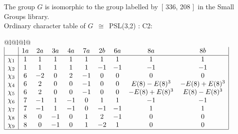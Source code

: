 \documentclass[varwidth=\maxdimen,border=10]{standalone}
\begin{document}
The group $G$ is isomorphic to the group labelled by\ [ 336, 208 ]\ in the Small Groups library.\\
Ordinary character table of $G$\ $\cong$\ PSL(3,2) : C2:\\
\begin{center}
\begin{tabular}{@{}l@{}l@{}l@{}}
\hline
\(\begin{array}{|l|ccccccccc|}
  & 1a & 2a & 3a & 4a & 7a & 2b & 6a & 8a & 8b\\ \hline
\chi_{1} & 1 & 1 & 1 & 1 & 1 & 1 & 1 & 1 & 1\\
\chi_{2} & 1 & 1 & 1 & 1 & 1 & -1 & -1 & -1 & -1\\
\chi_{3} & 6 & -2 & 0 & 2 & -1 & 0 & 0 & 0 & 0\\
\chi_{4} & 6 & 2 & 0 & 0 & -1 & 0 & 0 & E(8)-E(8)^{3} & -E(8)+E(8)^{3}\\
\chi_{5} & 6 & 2 & 0 & 0 & -1 & 0 & 0 & -E(8)+E(8)^{3} & E(8)-E(8)^{3}\\
\chi_{6} & 7 & -1 & 1 & -1 & 0 & 1 & 1 & -1 & -1\\
\chi_{7} & 7 & -1 & 1 & -1 & 0 & -1 & -1 & 1 & 1\\
\chi_{8} & 8 & 0 & -1 & 0 & 1 & 2 & -1 & 0 & 0\\
\chi_{9} & 8 & 0 & -1 & 0 & 1 & -2 & 1 & 0 & 0\\
\hline
\end{array}\)\\
\end{tabular}
\end{center}
\end{document}
